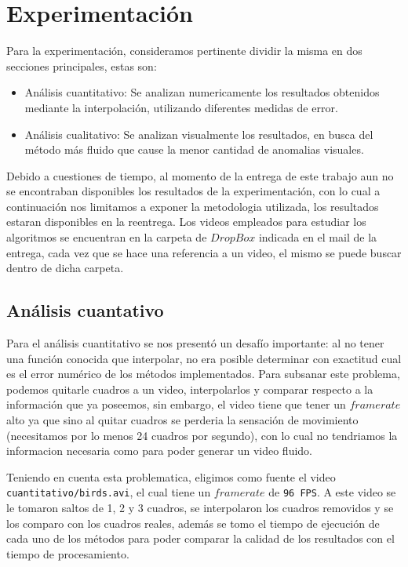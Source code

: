 \section{Experimentación}

Para la experimentación, consideramos pertinente dividir la misma en dos secciones principales, estas son:

\begin{itemize}
	\item Análisis cuantitativo: Se analizan numericamente los resultados obtenidos mediante la interpolación, utilizando diferentes medidas de error.
	\item Análisis cualitativo: Se analizan visualmente los resultados, en busca del método más fluido que cause la menor cantidad de anomalias visuales.
\end{itemize}

Debido a cuestiones de tiempo, al momento de la entrega de este trabajo aun no se encontraban disponibles los resultados de la experimentación, con lo cual a continuación nos limitamos a exponer la metodologia utilizada, los resultados estaran disponibles en la reentrega. Los videos empleados para estudiar los algoritmos se encuentran en la carpeta de $DropBox$ indicada en el mail de la entrega, cada vez que se hace una referencia a un video, el mismo se puede buscar dentro de dicha carpeta.

\subsection{Análisis cuantativo}

Para el análisis cuantitativo se nos presentó un desafío importante: al no tener una función conocida que interpolar, no era posible determinar con exactitud cual es el error numérico de los métodos implementados. Para subsanar este problema, podemos quitarle cuadros a un video, interpolarlos y comparar respecto a la información que ya poseemos, sin embargo, el video tiene que tener un $framerate$ alto ya que sino al quitar cuadros se perderia la sensación de movimiento (necesitamos por lo menos 24 cuadros por segundo), con lo cual no tendriamos la informacion necesaria como para poder generar un video fluido.

Teniendo en cuenta esta problematica, eligimos como fuente el video \texttt{cuantitativo/birds.avi}, el cual tiene un $framerate$ de \texttt{96 FPS}. A este video se le tomaron saltos de 1, 2 y 3 cuadros, se interpolaron los cuadros removidos y se los comparo con los cuadros reales, además se tomo el tiempo de ejecución de cada uno de los métodos para poder comparar la calidad de los resultados con el tiempo de procesamiento.

